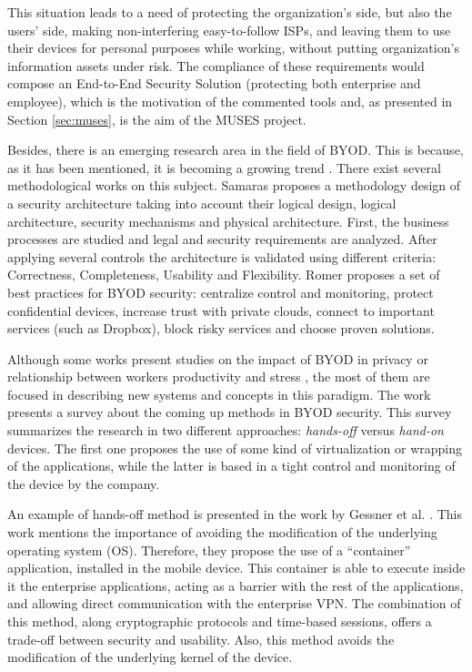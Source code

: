This situation leads to a need of protecting the organization's side, but also the users' side, making non-interfering easy-to-follow ISPs, and leaving them to use their devices for personal purposes while working, without putting organization's information assets under risk. The compliance of these requirements would compose an End-to-End Security Solution (protecting both enterprise and employee), which is the motivation of the commented tools and, as presented in Section \ref{sec:muses}, is the aim of the MUSES project.

Besides, there is an emerging research area in the field of BYOD. This is because, as it has been mentioned, it is becoming a growing trend \cite{Garba15organisational}. There exist several methodological works on this subject. Samaras \cite{Samaras13SaaS} proposes a methodology design of a security architecture taking into account their logical design, logical architecture, security mechanisms and physical architecture. First, the business processes are studied and legal and security requirements are analyzed. After applying several controls the architecture is validated using different criteria: Correctness, Completeness, Usability and Flexibility. Romer \cite{Romer14BestPractices} proposes a set of best practices for BYOD security: centralize control and monitoring, protect confidential devices, increase trust with private clouds, connect to important services (such as Dropbox), block risky services and choose proven solutions.

Although some works present studies on the impact of BYOD in privacy \cite{Miller12Privacy} or relationship between workers productivity and stress \cite{Haejung12Door}, the most of them are focused in describing new systems and concepts in this paradigm. The work \cite{Scarfo12survey} presents a survey about the coming up methods in BYOD security. This survey summarizes the research in two different approaches: {\em hands-off} versus {\em hand-on} devices. The first one proposes the use of some kind of virtualization or wrapping of the applications, while the latter is based in a tight control and monitoring of the device by the company.

An example of hands-off method is presented in the work by Gessner et al. \cite{Gessner13userfriendly}. This work mentions the importance of avoiding the modification of the underlying operating system (OS). Therefore, they propose the use of a ``container'' application, installed in the mobile device. This container is able to execute inside it the enterprise applications, acting as a barrier with the rest of the applications, and allowing direct communication with the enterprise VPN. The combination of this method, along cryptographic protocols and time-based sessions, offers a trade-off between security and usability. Also, this method avoids the modification of the underlying kernel of the device.

